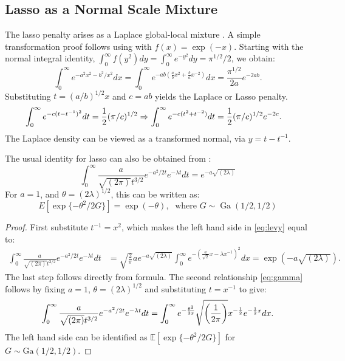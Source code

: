 \documentclass[lineno]{biometrika}
\begin{document}
\subsection{Lasso as a Normal Scale Mixture}
The lasso penalty arises as a Laplace global-local mixture \citep{andrews1974scale}. A simple transformation proof follows using \CS with $ f(x) = \exp(-x) $. Starting with the normal integral identity, $ \int_{0}^{\infty} f(y^2) dy = \int_0^\infty e^{-y^2} d y = {\pi}^{1/2}/2 $, we obtain:
$$
\int_0^\infty e^{- a^2 x^2 - b^2 / x^2 } d x = \int_0^{\infty} e^{-ab \left( \frac{a}{b} x^2 + \frac{b}{a}x^{-2} \right)} dx =  \frac{{\pi}^{1/2}}{2a} e^{- 2 ab}.
$$
Substituting $ t = (a/b)^{1/2} x $ and $c = ab$ yields the Laplace or Lasso penalty.  
\begin{align*}
  \int_0^\infty e^{- c (t - t^{-1})^2} d t & = \half (\pi/c)^{1/2} \Rightarrow \int_0^\infty e^{- c (t^2 + t^{-2})} d t = \half (\pi/c)^{1/2} e^{-2c}. %
\end{align*}
The Laplace density can be viewed as a transformed normal, via $y = t - t^{-1}$.

\begin{remark}
The usual identity for lasso can also be obtained from \citet{levy1940certains}:
\begin{equation}
  \int_{0}^{\infty} \frac{a}{\sqrt{(2\pi)} t^{3/2}} e^{-a^2/2t} e^{-\lambda t} dt = e^{-a\sqrt{(2\lambda)}} \label{eq:levy}
\end{equation}
For $a = 1$, and $\theta = (2\lambda)^{1/2}$, this can be written as: 
\begin{equation}
  E \left[\exp\{-\theta^2/2 G \} \right] = \exp(-\theta), \; \text{ where } G \sim \operatorname{Ga} (1/2, 1/2) \label{eq:gamma}
\end{equation}
\end{remark}

\begin{proof}
First substitute $t^{-1} = x^2$, which makes the left hand side in \eqref{eq:levy} equal to: 
\begin{align*}
\int_{0}^{\infty} \frac{a}{\sqrt{(2\pi)} t^{3/2}} e^{-a^2/2t} e^{-\lambda t} dt & = \sqrt{\frac{2}{\pi}} a e^{-a\sqrt{(2\lambda)}} \int_0^{\infty} e^{-\left(\frac{a}{\sqrt{2}} x - \lambda x^{-1}\right)^2} dx = \exp(-a\sqrt{(2\lambda)}).
\end{align*}
The last step follows directly from \CS formula. The second relationship \eqref{eq:gamma} follows by fixing $a = 1$, $\theta = (2\lambda)^{1/2}$ and substituting $t = x^{-1}$ to give: 
$$
\int_{0}^{\infty} \frac{a}{\sqrt{(2\pi)} t^{3/2}} e^{-a^2/2t} e^{-\lambda t} dt = \int_{0}^{\infty} e^{-\frac{\theta^2}{2x}} \sqrt{\left(\frac{1}{2\pi}\right)} x^{-\frac{1}{2}} e^{-\frac{1}{2} x} dx.
$$
The left hand side can be identified as $\mathbb{E} \left[\exp\{-\theta^2/2 G \} \right]$ for $G \sim \mbox{Ga}(1/2,1/2)$. %
\end{proof}
\end{document}
